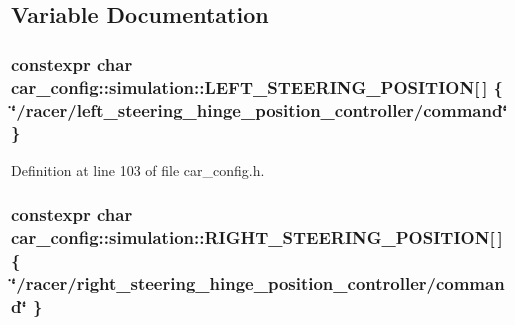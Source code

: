 \subsection{Variable Documentation}
\subsubsection[{\texorpdfstring{L\+E\+F\+T\+\_\+\+S\+T\+E\+E\+R\+I\+N\+G\+\_\+\+P\+O\+S\+I\+T\+I\+ON}{LEFT_STEERING_POSITION}}]{\setlength{\rightskip}{0pt plus 5cm}constexpr char car\+\_\+config\+::simulation\+::\+L\+E\+F\+T\+\_\+\+S\+T\+E\+E\+R\+I\+N\+G\+\_\+\+P\+O\+S\+I\+T\+I\+ON\mbox{[}$\,$\mbox{]} \{ \char`\"{}/racer/left\+\_\+steering\+\_\+hinge\+\_\+position\+\_\+controller/command\char`\"{} \}}\hypertarget{namespacecar__config_1_1simulation_a0547cf8102d3f1d49eab8cc27c199247}{}\label{namespacecar__config_1_1simulation_a0547cf8102d3f1d49eab8cc27c199247}


Definition at line 103 of file car\+\_\+config.\+h.

\subsubsection[{\texorpdfstring{R\+I\+G\+H\+T\+\_\+\+S\+T\+E\+E\+R\+I\+N\+G\+\_\+\+P\+O\+S\+I\+T\+I\+ON}{RIGHT_STEERING_POSITION}}]{\setlength{\rightskip}{0pt plus 5cm}constexpr char car\+\_\+config\+::simulation\+::\+R\+I\+G\+H\+T\+\_\+\+S\+T\+E\+E\+R\+I\+N\+G\+\_\+\+P\+O\+S\+I\+T\+I\+ON\mbox{[}$\,$\mbox{]} \{ \char`\"{}/racer/right\+\_\+steering\+\_\+hinge\+\_\+position\+\_\+controller/command\char`\"{} \}}\hypertarget{namespacecar__config_1_1simulation_a4f5267acab1b061953937bc84a7a6e28}{}\label{namespacecar__config_1_1simulation_a4f5267acab1b061953937bc84a7a6e28}


